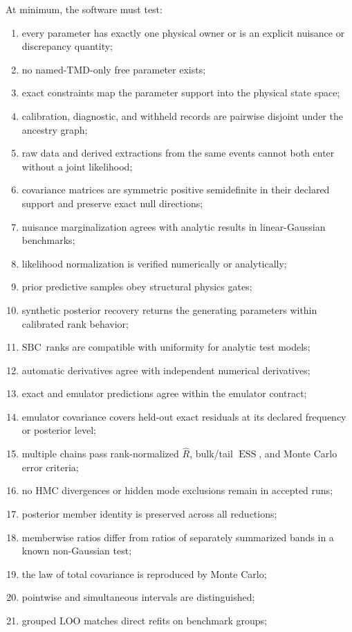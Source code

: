 \documentclass[11pt]{article}
\newcommand{\ESS}{\operatorname{ESS}}
\newcommand{\Rhat}{\widehat R}
\newcommand{\SBC}{\ensuremath{\mathrm{SBC}}}
\newcommand{\LOO}{\ensuremath{\mathrm{LOO}}}
\begin{document}
At minimum, the software must test:
\begin{enumerate}
\item every parameter has exactly one physical owner or is an explicit nuisance
or discrepancy quantity;
\item no named-TMD-only free parameter exists;
\item exact constraints map the parameter support into the physical state
space;
\item calibration, diagnostic, and withheld records are pairwise disjoint under
the ancestry graph;
\item raw data and derived extractions from the same events cannot both enter
without a joint likelihood;
\item covariance matrices are symmetric positive semidefinite in their declared
support and preserve exact null directions;
\item nuisance marginalization agrees with analytic results in linear-Gaussian
benchmarks;
\item likelihood normalization is verified numerically or analytically;
\item prior predictive samples obey structural physics gates;
\item synthetic posterior recovery returns the generating parameters within
calibrated rank behavior;
\item \SBC\ ranks are compatible with uniformity for analytic test models;
\item automatic derivatives agree with independent numerical derivatives;
\item exact and emulator predictions agree within the emulator contract;
\item emulator covariance covers held-out exact residuals at its declared
frequency or posterior level;
\item multiple chains pass rank-normalized \(\Rhat\), bulk/tail \(\ESS\), and
Monte Carlo error criteria;
\item no HMC divergences or hidden mode exclusions remain in accepted runs;
\item posterior member identity is preserved across all reductions;
\item memberwise ratios differ from ratios of separately summarized bands in a
known non-Gaussian test;
\item the law of total covariance is reproduced by Monte Carlo;
\item pointwise and simultaneous intervals are distinguished;
\item grouped \(\LOO\) matches direct refits on benchmark groups;

\end{enumerate}
\end{document}
